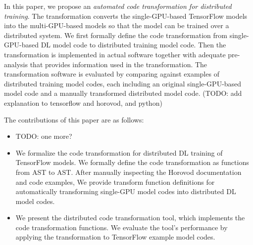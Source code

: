 In this paper, we propose an 
\textit{automated code transformation for distributed training}.
The transformation
converts the single-GPU-based TensorFlow models
into the multi-GPU-based models so that the model can be trained
over a distributed system.
We first formally define the code transformation from
single-GPU-based DL model code to distributed training model code.
Then the transformation is implemented in actual software together with
adequate pre-analysis that provides information used in the transformation.
The transformation software is evaluated by comparing against 
examples of distributed training model codes, 
each including an original single-GPU-based model code 
and a manually transformed distributed model code.
(TODO: add explanation to tensorflow and horovod, and python)

The contributions of this paper are as follows:

\begin{itemize}
  \item TODO: one more?

  \item We formalize the code transformation for distributed DL training
        of TensorFlow models. We formally define the code transformation
        as functions from AST to AST. After manually inspecting
        the Horovod documentation and code examples,
        We provide transform function definitions for 
        automatically transforming single-GPU model codes into
        distributed DL model codes.

  \item We present the distributed code transformation tool, which implements
        the code transformation functions. We evaluate the tool's performance
        by applying the transformation to TensorFlow example model codes.
\end{itemize}
